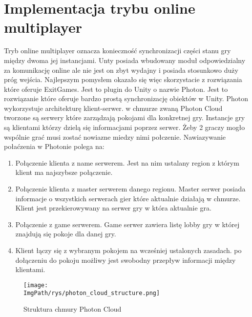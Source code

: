 \documentclass[a4paper,12pt,twoside,openany]{report}
\newcommand{\ImgPath}{.}
\begin{document}
\section{Implementacja trybu online multiplayer}
\label{implementation_online}
Tryb online multiplayer oznacza konieczność synchronizacji części stanu gry między dwoma jej instancjami. Unty posiada wbudowany moduł odpowiedzialny za komunikację online ale nie jest on zbyt wydajny i posiada stosunkowo duży próg wejścia. Najlepszym pomysłem okazało się więc skorzystacie z rozwiązania które oferuje ExitGames. Jest to plugin do Unity o nazwie Photon. Jest to rozwiązanie które oferuje bardzo prostą synchronizację obiektów w Unity. Photon wykorzystuje architekturę klient-serwer. w chmurze zwaną Photon Cloud tworzone są serwery które zarządzają pokojami dla konkretnej gry. Instancje gry są klientami którzy dzielą się informacjami poprzez serwer. Żeby 2 graczy mogło wspólnie grać musi zostać nowiazne miedzy nimi połczenie. Nawiazywanie połaćzenia w Photonie polega na:
\begin{enumerate}
    \item Połączenie klienta z name serwerem. Jest na nim ustalany region z którym klient ma najszybsze połączenie.
    \item Połączenie klienta z master serwerem danego regionu. Master serwer posiada informacje o wszystkich serwerach gier które aktualnie działają w chmurze. Klient jest przekierowywany na serwer gry w która aktualnie gra.
    \item Połączenie z game serwerem. Game serwer zawiera listę lobby gry w której znajdują się pokoje dla danej gry.
    \item Klient łączy się z wybranym pokojem na wcześniej ustalonych zasadach. po dołączeniu do pokoju możliwy jest swobodny przepływ informacji między klientami.
\end{enumerate}

\begin{figure}[H]
	\begin{center}
\centering
\texttt{[image: \\ImgPath/rys/photon\_cloud\_structure.png]}
\end{center}
	\caption{Struktura chmury Photon Cloud}
	\label{photon_cloud_structure}
\end{figure}
\end{document}
